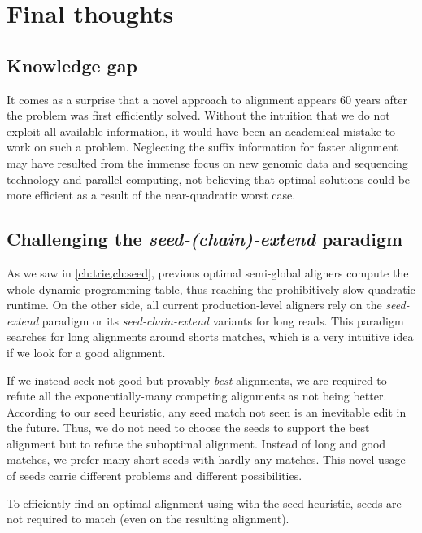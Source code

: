 \section*{Final thoughts}

\subsection*{Knowledge gap}

It comes as a surprise that a novel approach to alignment appears 60 years after
the problem was first efficiently solved. Without the intuition that we do not
exploit all available information, it would have been an academical mistake to
work on such a problem. Neglecting the suffix information for faster alignment
may have resulted from the immense focus on new genomic data and sequencing
technology and parallel computing, not believing that optimal solutions could be
more efficient as a result of the near-quadratic worst case.

\subsection*{Challenging the \emph{seed-(chain)-extend} paradigm}

As we saw in \cref{ch:trie,ch:seed}, previous optimal semi-global aligners
compute the whole dynamic programming table, thus reaching the prohibitively
slow quadratic runtime. On the other side, all current production-level aligners
rely on the \emph{seed-extend} paradigm or its \emph{seed-chain-extend} variants
for long reads. This paradigm searches for long alignments around shorts
matches, which is a very intuitive idea if we look for a good alignment.

If we instead seek not good but provably \emph{best} alignments, we are required
to refute all the exponentially-many competing alignments as not being better.
According to our seed heuristic, any seed match not seen is an inevitable edit
in the future. Thus, we do not need to choose the seeds to support the best
alignment but to refute the suboptimal alignment. Instead of long and good
matches, we prefer many short seeds with hardly any matches. This novel usage of
seeds carrie different problems and different possibilities.

\begin{observation}
    To efficiently find an optimal alignment using \A with the seed heuristic,
    seeds are not required to match (even on the resulting alignment).
\end{observation}


